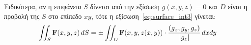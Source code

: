 Ειδικότερα, αν η επιφάνεια $S$ δίνεται από την εξίσωση $ g(x,y,z) = 0 $ και $D$ είναι η
προβολή της $S$ στο επίπεδο $ xy $, τότε η εξίσωση~\eqref{eq:surface_int3} γίνεται:
\[
  \iint_{S} \mathbf{F}(x,y,z) \,{dS} = \pm\iint_{D} \mathbf{F}(x,y,z(x,y)) 
  \cdot \frac{(g_{x},g_{y},g_{z})}{\abs{g_{z}}} \,{dx}{dy} 
\]



